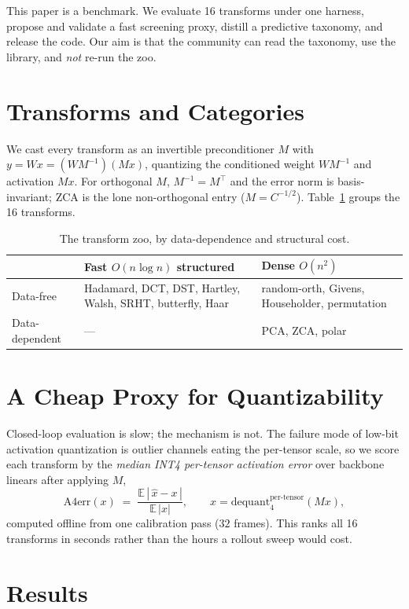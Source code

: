 \documentclass[conference]{IEEEtran}
\begin{document}
This paper is a benchmark. We evaluate 16 transforms under one harness, propose and validate
a fast screening proxy, distill a predictive taxonomy, and release the code. Our aim is that
the community can read the taxonomy, use the library, and \emph{not} re-run the zoo.

\section{Transforms and Categories}
We cast every transform as an invertible preconditioner $M$ with
$y=Wx=(WM^{-1})(Mx)$, quantizing the conditioned weight $WM^{-1}$ and activation $Mx$. For
orthogonal $M$, $M^{-1}=M^\top$ and the error norm is basis-invariant; ZCA is the lone
non-orthogonal entry ($M=C^{-1/2}$). Table~\ref{tab:cat} groups the 16 transforms.

\begin{table}[h]\centering
\caption{The transform zoo, by data-dependence and structural cost.}
\label{tab:cat}
\begin{tabular}{lll}
\toprule
 & Fast $O(n\log n)$ structured & Dense $O(n^2)$ \\
\midrule
Data-free & Hadamard, DCT, DST, Hartley, Walsh, SRHT, butterfly, Haar & random-orth, Givens, Householder, permutation \\
Data-dependent & --- & PCA, ZCA, polar \\
\bottomrule
\end{tabular}
\end{table}

\section{A Cheap Proxy for Quantizability}
Closed-loop evaluation is slow; the mechanism is not. The failure mode of low-bit activation
quantization is outlier channels eating the per-tensor scale, so we score each transform by
the \emph{median INT4 per-tensor activation error} over backbone linears after applying $M$,
\begin{equation}
\mathrm{A4err}(x) \;=\; \frac{\mathbb{E}\,|\,\hat x - x\,|}{\mathbb{E}\,|x|},\qquad
\hat x = \mathrm{dequant}_{4}^{\text{per-tensor}}(Mx),
\end{equation}
computed offline from one calibration pass ($32$ frames). This ranks all 16 transforms in
seconds rather than the hours a rollout sweep would cost.

\section{Results}
\end{document}
